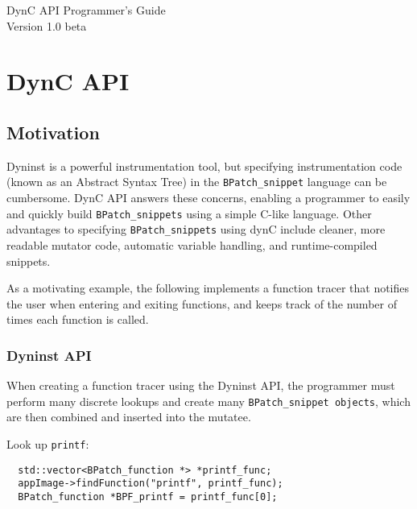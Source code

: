 \documentclass{article}
\begin{document}
\begin{center} \Huge{DynC API Programmer's Guide} \\
\huge{Version 1.0 beta}\\
\vspace{8cm}
\end{center}
\pagebreak
\tableofcontents
\pagebreak

\section{DynC API}
\subsection{Motivation}
Dyninst is a powerful instrumentation tool, but specifying instrumentation code (known as an Abstract Syntax Tree) in the \verb!BPatch_snippet! language can be cumbersome. DynC API answers these concerns, enabling a programmer to easily and quickly build \verb!BPatch_snippets! using a simple C-like language. Other advantages to specifying \verb!BPatch_snippets! using dynC include cleaner, more readable mutator code, automatic variable handling, and runtime-compiled snippets.

As a motivating example, the following implements a function tracer that notifies the user when entering and exiting functions, and keeps track of the number of times each function is called.

\subsubsection{Dyninst API}
When creating a function tracer using the Dyninst API, the programmer must perform many discrete lookups and create many \verb!BPatch_snippet objects!, which are then combined and inserted into the mutatee.

\vspace{0.5cm}


\lstset{basicstyle=\small, showstringspaces=false, stringstyle=\ttfamily}

\noindent Look up \verb!printf!:
\begin{lstlisting}
  std::vector<BPatch_function *> *printf_func;
  appImage->findFunction("printf", printf_func);
  BPatch_function *BPF_printf = printf_func[0];
\end{lstlisting}
\end{document}
